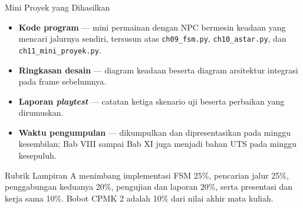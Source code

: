 \documentclass[aspectratio=169,10pt]{beamer}
\begin{document}
\begin{frame}{Mini Proyek yang Dihasilkan}
\begin{itemize}
  \item \textbf{Kode program} --- mini permainan dengan NPC bermesin keadaan
        yang mencari jalurnya sendiri, tersusun atas \texttt{ch09\_fsm.py},
        \texttt{ch10\_astar.py}, dan \texttt{ch11\_mini\_proyek.py}.
  \item \textbf{Ringkasan desain} --- diagram keadaan beserta diagram arsitektur
        integrasi pada frame sebelumnya.
  \item \textbf{Laporan \emph{playtest}} --- catatan ketiga skenario uji beserta
        perbaikan yang dirumuskan.
  \item \textbf{Waktu pengumpulan} --- dikumpulkan dan dipresentasikan pada
        minggu kesembilan; Bab VIII sampai Bab XI juga menjadi bahan UTS pada
        minggu kesepuluh.
\end{itemize}
\vspace{0.1cm}
\begin{kotak}
Rubrik Lampiran A menimbang implementasi FSM 25\%, pencarian jalur 25\%,
penggabungan keduanya 20\%, pengujian dan laporan 20\%, serta presentasi dan
kerja sama 10\%. Bobot CPMK 2 adalah 10\% dari nilai akhir mata kuliah.
\end{kotak}
\end{frame}
\end{document}
